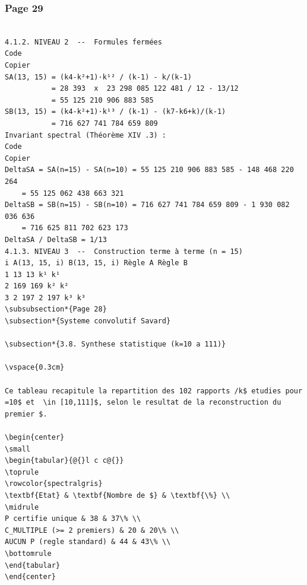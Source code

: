 \documentclass[11pt,a4paper]{article}
\begin{document}
\subsubsection*{Page 29}
\begin{Verbatim}[fontsize=\footnotesize]
 
4.1.2. NIVEAU 2  --  Formules fermées 
Code 
Copier 
SA(13, 15) = (k4-k²+1)·k¹² / (k-1) - k/(k-1) 
           = 28 393  x  23 298 085 122 481 / 12 - 13/12 
           = 55 125 210 906 883 585 
SB(13, 15) = (k4-k²+1)·k¹³ / (k-1) - (k7-k6+k)/(k-1) 
           = 716 627 741 784 659 809 
Invariant spectral (Théorème XIV .3) : 
Code 
Copier 
DeltaSA = SA(n=15) - SA(n=10) = 55 125 210 906 883 585 - 148 468 220 264 
    = 55 125 062 438 663 321 
DeltaSB = SB(n=15) - SB(n=10) = 716 627 741 784 659 809 - 1 930 082 036 636 
    = 716 625 811 702 623 173 
DeltaSA / DeltaSB = 1/13   
4.1.3. NIVEAU 3  --  Construction terme à terme (n = 15) 
i A(13, 15, i) B(13, 15, i) Règle A Règle B 
1 13 13 k¹ k¹ 
2 169 169 k² k² 
3 2 197 2 197 k³ k³ 
\subsubsection*{Page 28}
\subsection*{Systeme convolutif Savard}

\subsection*{3.8. Synthese statistique (k=10 a 111)}

\vspace{0.3cm}

Ce tableau recapitule la repartition des 102 rapports /k$ etudies pour =10$ et  \in [10,111]$, selon le resultat de la reconstruction du premier $.

\begin{center}
\small
\begin{tabular}{@{}l c c@{}}
\toprule
\rowcolor{spectralgris}
\textbf{Etat} & \textbf{Nombre de $} & \textbf{\%} \\
\midrule
P certifie unique & 38 & 37\% \\
C_MULTIPLE (>= 2 premiers) & 20 & 20\% \\
AUCUN P (regle standard) & 44 & 43\% \\
\bottomrule
\end{tabular}
\end{center}


\end{Verbatim}
\end{document}
